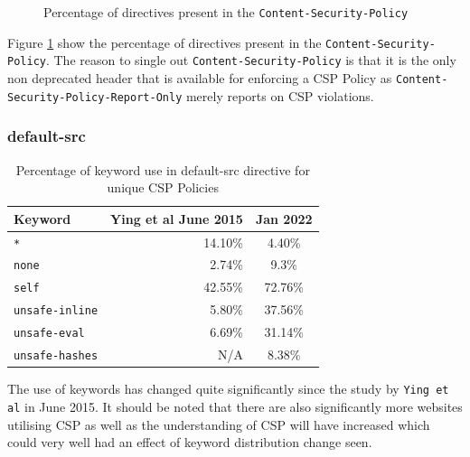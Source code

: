 \documentclass{mscreport}
\begin{document}
\begin{figure}[H]
	\begin{center}
		\caption{Percentage of directives present in the \texttt{Content-Security-Policy}}
		\label{fig:csp_csp_by_directives}
	\end{center}
\end{figure}

Figure \ref{fig:csp_csp_by_directives} show the percentage of directives present in the \texttt{Content-Security-Policy}. The reason to single out \texttt{Content-Security-Policy} is that it is the only non deprecated header that is available for enforcing a CSP Policy as \texttt{Content-Security-Policy-Report-Only} merely reports on CSP violations.

\subsubsection{default-src}

\begin{table}[H]
  \begin{center}
    \begin{tabular}{|l|D|c|}  %
      \hline
      \textbf{Keyword} & \textbf{Ying et al} \cite{Ying2016-ag} June 2015 & Jan 2022 \\
      \hline
      \texttt{*} & 14.10\% & 4.40\%\\
      \hline
      \texttt{none} & 2.74\% & 9.3\%\\
      \hline
      \texttt{self} & 42.55\% & 72.76\%\\
      \hline
      \texttt{unsafe-inline} & 5.80\% & 37.56\%\\
      \hline
      \texttt{unsafe-eval} & 6.69\% & 31.14\%\\
      \hline
      \texttt{unsafe-hashes} & N/A & 8.38\%\\
      \hline
    \end{tabular}
    \caption{Percentage of keyword use in default-src directive for unique CSP Policies}
    \label{table:csp_default-src-keyword} %
  \end{center}
\end{table}
\noindent
The use of keywords has changed quite significantly since the study by \texttt{Ying et al} \cite{Ying2016-ag} in June 2015. It should be noted that there are also significantly more websites utilising CSP as well as the understanding of CSP will have increased which could very well had an effect of keyword distribution change seen.
\end{document}
